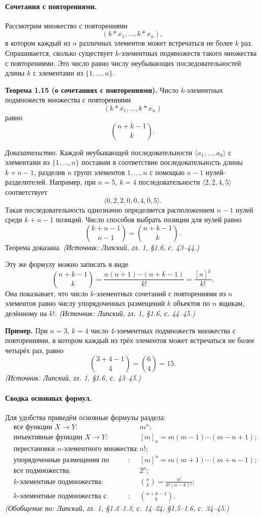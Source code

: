 \documentclass[a4paper,12pt]{article}
\begin{document}
\paragraph{Сочетания с повторениями.}
Рассмотрим множество с повторениями
\[
(k*x_1,\dots,k*x_n),
\]
в котором каждый из \(n\) различных элементов может встречаться не более \(k\) раз. Спрашивается, сколько существует \(k\)-элементных подмножеств такого множества с повторениями. Это число равно числу неубывающих последовательностей длины \(k\) с элементами из \(\{1,\dots,n\}\).

\textbf{Теорема 1.15 (о сочетаниях с повторениями).} Число \(k\)-элементных подмножеств множества с повторениями
\[
(k*x_1,\dots,k*x_n)
\]
равно
\[
\binom{n+k-1}{k}.
\]

\emph{Доказательство.} Каждой неубывающей последовательности \(\langle a_1,\dots,a_k\rangle\) с элементами из \(\{1,\dots,n\}\) поставим в соответствие последовательность длины \(k+n-1\), разделив \(n\) групп элементов \(1,\dots,n\) с помощью \(n-1\) нулей-разделителей. Например, при \(n=5\), \(k=4\) последовательности \(\langle 2,2,4,5\rangle\) соответствует
\[
\langle 0,2,2,0,0,4,0,5\rangle.
\]
Такая последовательность однозначно определяется расположением \(n-1\) нулей среди \(k+n-1\) позиций. Число способов выбрать позиции для нулей равно
\[
\binom{k+n-1}{n-1}=\binom{n+k-1}{k}.
\]
Теорема доказана.
\textit{(Источник: Липский, гл. 1, §1.6, с. 43--44.)}

Эту же формулу можно записать в виде
\[
\binom{n+k-1}{k}=\frac{n(n+1)\cdots(n+k-1)}{k!}=\frac{[n]^k}{k!}.
\]
Она показывает, что число \(k\)-элементных сочетаний с повторениями из \(n\) элементов равно числу упорядоченных размещений \(k\) объектов по \(n\) ящикам, делённому на \(k!\).
\textit{(Источник: Липский, гл. 1, §1.6, с. 44--45.)}

\textbf{Пример.} При \(n=3\), \(k=4\) число \(4\)-элементных подмножеств множества с повторениями, в котором каждый из трёх элементов может встречаться не более четырёх раз, равно
\[
\binom{3+4-1}{4}=\binom{6}{4}=15.
\]
\textit{(Источник: Липский, гл. 1, §1.6, с. 43--45.)}

\paragraph{Сводка основных формул.}
Для удобства приведём основные формулы раздела:
\[
\begin{aligned}
&\text{все функции }X\to Y: && m^n;\\
&\text{инъективные функции }X\to Y: && [m]_n=m(m-1)\cdots(m-n+1);\\
&\text{перестановки }n\text{-элементного множества}: && n!;\\
&\text{упорядоченные размещения по ящикам}: && [m]^n=m(m+1)\cdots(m+n-1);\\
&\text{все подмножества}: && 2^n;\\
&\text{\(k\)-элементные подмножества}: && \binom{n}{k}=\frac{n!}{k!(n-k)!};\\
&\text{\(k\)-элементные подмножества с повторениями}: && \binom{n+k-1}{k}.
\end{aligned}
\]
\textit{(Обобщение по: Липский, гл. 1, §1.2--1.3, с. 14--24; §1.5--1.6, с. 34--45.)}
\end{document}
